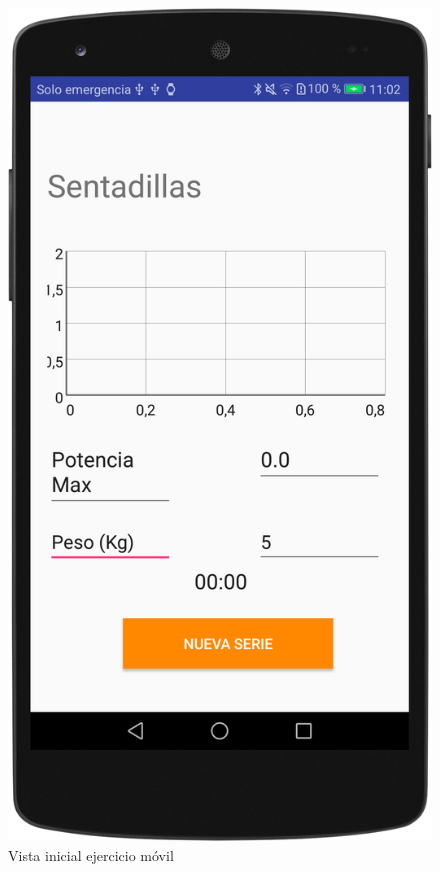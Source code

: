 \begin{figure}[H]
	\centering
	\includegraphics[scale=0.10]{imagenes/m6.png}
	\caption{Vista inicial ejercicio móvil}
	\label{Vista inicial ejercicio movil}
\end{figure}

